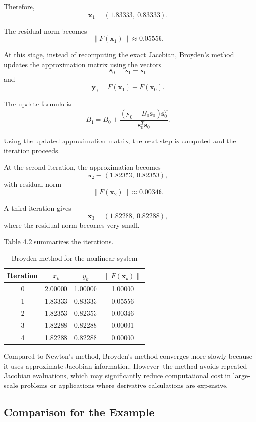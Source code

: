 Therefore,
\[
\mathbf{x}_1
=
(1.83333,\ 0.83333).
\]

The residual norm becomes
\[
\|F(\mathbf{x}_1)\|
\approx
0.05556.
\]

At this stage, instead of recomputing the exact Jacobian, Broyden's method updates the approximation matrix using the vectors
\[
\mathbf{s}_0
=
\mathbf{x}_1-\mathbf{x}_0
\]
and
\[
\mathbf{y}_0
=
F(\mathbf{x}_1)-F(\mathbf{x}_0).
\]

The update formula is
\[
B_{1}
=
B_0
+
\frac{
(\mathbf{y}_0-B_0\mathbf{s}_0)\mathbf{s}_0^T
}{
\mathbf{s}_0^T\mathbf{s}_0
}.
\]

Using the updated approximation matrix, the next step is computed and the iteration proceeds.

At the second iteration, the approximation becomes
\[
\mathbf{x}_2
=
(1.82353,\ 0.82353),
\]
with residual norm
\[
\|F(\mathbf{x}_2)\|
\approx
0.00346.
\]

A third iteration gives
\[
\mathbf{x}_3
=
(1.82288,\ 0.82288),
\]
where the residual norm becomes very small.

Table 4.2 summarizes the iterations.

\begin{table}[h!]
\centering
\caption{Broyden method for the nonlinear system}
\label{tab:broyden_example}
\begin{tabular}{|c|c|c|c|}
\hline
Iteration & \(x_k\) & \(y_k\) & \(\|F(\mathbf{x}_k)\|\) \\ \hline
0 & 2.00000 & 1.00000 & 1.00000 \\ \hline
1 & 1.83333 & 0.83333 & 0.05556 \\ \hline
2 & 1.82353 & 0.82353 & 0.00346 \\ \hline
3 & 1.82288 & 0.82288 & 0.00001 \\ \hline
4 & 1.82288 & 0.82288 & 0.00000 \\ \hline
\end{tabular}
\end{table}

Compared to Newton's method, Broyden's method converges more slowly because it uses approximate Jacobian information. However, the method avoids repeated Jacobian evaluations, which may significantly reduce computational cost in large-scale problems or applications where derivative calculations are expensive.

\subsection{Comparison for the Example}

